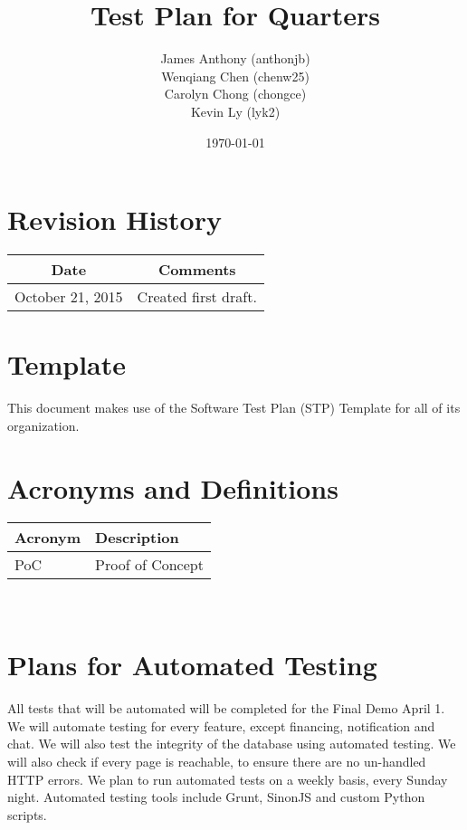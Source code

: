 \documentclass[12pt]{article}
\begin{document}
\title{Test Plan for Quarters} 
\author{James Anthony (anthonjb)\\ Wenqiang Chen (chenw25)\\ Carolyn Chong 
(chongce)\\ Kevin Ly (lyk2)}
\date{\today}
  
\maketitle

\pagebreak

\tableofcontents

\section*{Revision History}
\begin{tabular}{|c|c|}
\hline
\textbf{Date}  & \textbf{Comments} \\ \hline
October 21, 2015 & Created first draft. \\ 
\hline
\end{tabular}

\section*{Template}
This document makes use of the Software Test Plan (STP) Template for all of its organization.

\pagebreak


\section{Acronyms and Definitions}
\renewcommand{\arraystretch}{1.2}
\begin{tabular}{l l} 
  \toprule    
  \textbf{Acronym} & \textbf{Description}\\
  \midrule 
  PoC   &Proof of Concept\\
  \bottomrule
\end{tabular}\\


\section{Plans for Automated Testing}
All tests that will be automated will be completed for the Final Demo April 1. We will automate testing for every feature, except financing, notification and chat. We will also test the integrity of the database using automated testing. We will also check if every page is reachable, to ensure there are no un-handled HTTP errors. We plan to run automated tests on a weekly basis, every Sunday night. Automated testing tools include Grunt, SinonJS and custom Python scripts. 
\end{document}

